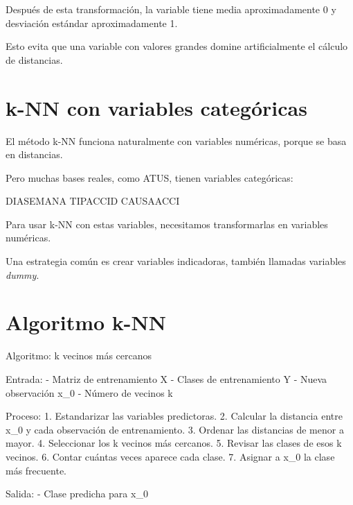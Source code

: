 \documentclass[
  11pt,
  letterpaper,
]{book}
\newenvironment{Shaded}{\begin{snugshade}}{\end{snugshade}}
\newcommand{\NormalTok}[1]{\textcolor[rgb]{0.00,0.23,0.31}{#1}}
\begin{document}
Después de esta transformación, la variable tiene media aproximadamente
0 y desviación estándar aproximadamente 1.

Esto evita que una variable con valores grandes domine artificialmente
el cálculo de distancias.

\section{k-NN con variables
categóricas}\label{k-nn-con-variables-categuxf3ricas}

El método k-NN funciona naturalmente con variables numéricas, porque se
basa en distancias.

Pero muchas bases reales, como ATUS, tienen variables categóricas:

\begin{Shaded}
\begin{Highlighting}[]
\NormalTok{DIASEMANA}
\NormalTok{TIPACCID}
\NormalTok{CAUSAACCI}
\end{Highlighting}
\end{Shaded}

Para usar k-NN con estas variables, necesitamos transformarlas en
variables numéricas.

Una estrategia común es crear variables indicadoras, también llamadas
variables \emph{dummy}.

\section{Algoritmo k-NN}\label{algoritmo-k-nn}

\begin{Shaded}
\begin{Highlighting}[]
\NormalTok{Algoritmo: k vecinos más cercanos}

\NormalTok{Entrada:}
\NormalTok{  {-} Matriz de entrenamiento X}
\NormalTok{  {-} Clases de entrenamiento Y}
\NormalTok{  {-} Nueva observación x\_0}
\NormalTok{  {-} Número de vecinos k}

\NormalTok{Proceso:}
\NormalTok{  1. Estandarizar las variables predictoras.}
\NormalTok{  2. Calcular la distancia entre x\_0 y cada observación de entrenamiento.}
\NormalTok{  3. Ordenar las distancias de menor a mayor.}
\NormalTok{  4. Seleccionar los k vecinos más cercanos.}
\NormalTok{  5. Revisar las clases de esos k vecinos.}
\NormalTok{  6. Contar cuántas veces aparece cada clase.}
\NormalTok{  7. Asignar a x\_0 la clase más frecuente.}

\NormalTok{Salida:}
\NormalTok{  {-} Clase predicha para x\_0}
\end{Highlighting}
\end{Shaded}
\end{document}
